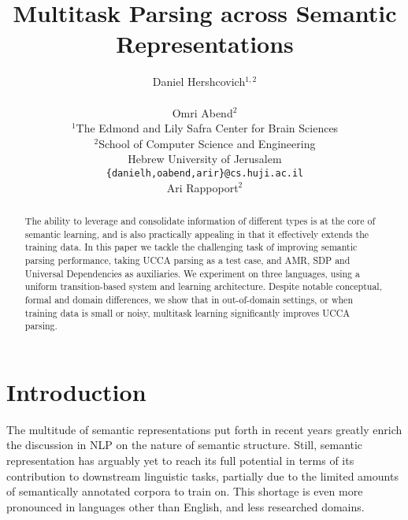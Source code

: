 \documentclass[11pt,a4paper]{article}
\title{Multitask Parsing across Semantic Representations}
\author{Daniel Hershcovich$^{1,2}$ \\
  \\\And
  Omri Abend$^2$ \\
  $^1$The Edmond and Lily Safra Center for Brain Sciences \\
  $^2$School of Computer Science and Engineering \\
  Hebrew University of Jerusalem \\
  \texttt{\{danielh,oabend,arir\}@cs.huji.ac.il}
  \\\And
  Ari Rappoport$^2$
}
\date{}
\begin{document}
\maketitle

\begin{abstract}
The ability to leverage and consolidate information of different types
is at the core of semantic learning, and is also practically appealing
in that it effectively extends the training data. In this paper we
tackle the challenging task of improving semantic parsing
performance, taking UCCA
parsing as a test case, and AMR, SDP and Universal Dependencies
as auxiliaries.
We experiment on three languages,
using a uniform transition-based system and learning architecture.
Despite notable conceptual, formal and domain differences,
we show that in out-of-domain settings, or when training data is small or noisy,
multitask learning significantly improves UCCA parsing.
\end{abstract}

\section{Introduction}\label{sec:introduction}

The multitude of semantic representations put forth in recent years greatly enrich
the discussion in NLP on the nature of semantic structure.
Still, semantic representation has arguably yet to reach its full 
potential in terms of its contribution to downstream linguistic tasks,
partially due to the limited amounts of semantically annotated
corpora to train on. This shortage is even more pronounced in 
languages other than English, and less researched domains. 

\end{document}
